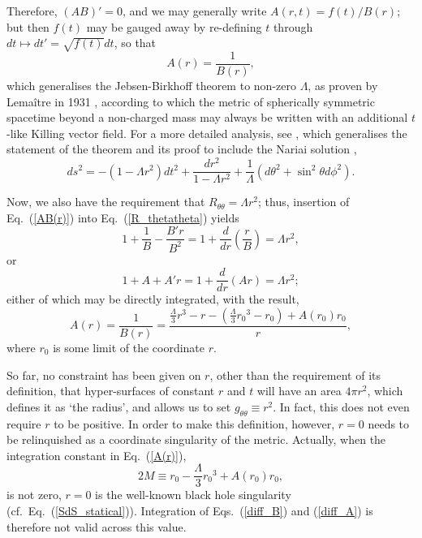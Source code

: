 Therefore, $(AB)'=0$, and we may generally write $A(r,t)=f(t)/B(r)$; but then $f(t)$ may be gauged away by re-defining $t$ through $dt\mapsto{dt'}=\sqrt{f(t)}dt$, so that
\begin{equation}
A(r)=\frac{1}{B(r)}\label{AB(r)},
\end{equation} 
which generalises the Jebsen-Birkhoff theorem \cite{Jebsen1921,Jebsen2005,Birkhoff1923} to non-zero $\Lambda$, as proven by Lema\^{i}tre in 1931 \cite{Lemaitre1931b}, according to which the metric of spherically symmetric spacetime beyond a non-charged mass may always be written with an additional $t$-like Killing vector field. For a more detailed analysis, see \cite{Schleich2010}, which generalises the statement of the theorem and its proof to include the Nariai solution \cite{Nariai1950,Nariai1999a,Nariai1951,Nariai1999b}, 
\begin{equation}
ds^2=-\left(1-\Lambda{r^2}\right)dt^2+\frac{dr^2}{1-\Lambda{r^2}}+\frac{1}{\Lambda}\left(d\theta^2+\sin^2\theta{d\phi^2}\right).\label{Nariai}
\end{equation}

Now, we also have the requirement that $R_{\theta\theta}=\Lambda{r^2}$; thus, insertion of Eq.~(\ref{AB(r)}) into Eq.~(\ref{R_thetatheta}) yields
\begin{equation}
1+\frac{1}{B}-\frac{B'r}{B^2}=1+\frac{d}{dr}\left(\frac{r}{B}\right)=\Lambda{r^2},\label{diff_B}
\end{equation}
or
\begin{equation}
1+A+A'r=1+\frac{d}{dr}\left(Ar\right)=\Lambda{r^2};\label{diff_A}
\end{equation}
either of which may be directly integrated, with the result,
\begin{equation}
A(r)=\frac{1}{B(r)}=\frac{\frac{\Lambda}{3}r^3-r-\left(\frac{\Lambda}{3}{r_0}^3-r_0\right)+A(r_0)r_0}{r},\label{A(r)}
\end{equation}
where $r_0$ is some limit of the coordinate $r$. 

So far, no constraint has been given on $r$, other than the requirement of its definition, that hyper-surfaces of constant $r$ and $t$ will have an area $4\pi{r^2}$, which defines it as `the radius', and allows us to set $g_{\theta\theta}\equiv{r^2}$. In fact, this does not even require $r$ to be positive. In order to make this definition, however, $r=0$ needs to be relinquished as a coordinate singularity of the metric. Actually, when the integration constant in Eq.~(\ref{A(r)}),
\begin{equation}
2M\equiv{r_0-\frac{\Lambda}{3}{r_0}^3+A(r_0)r_0},\label{2M}
\end{equation}
is not zero, $r=0$ is the well-known black hole singularity (cf.~Eq.~(\ref{SdS_statical})). Integration of Eqs.~(\ref{diff_B}) and (\ref{diff_A}) is therefore not valid across this value.

